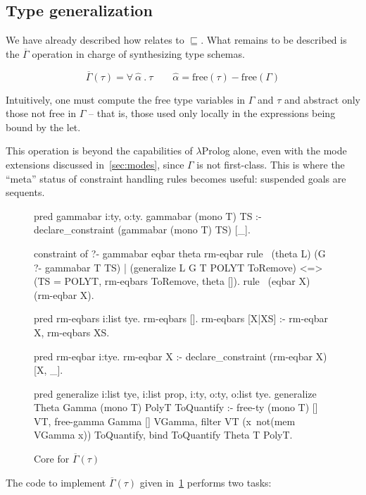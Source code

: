 \documentclass{these-ISSS}
\newenvironment{elpicode}
  {\VerbatimEnvironment\begin{elpibox}\begin{xelpicode}}{\end{xelpicode}
\end{elpibox}}
\begin{document}
\subsection{Type generalization}

We have already described how  relates to $\sqsubseteq$.
What remains to be described is the $\overline{\Gamma}$ operation
in charge of synthesizing type schemas.

$$
\overline{\Gamma}(\tau) = \forall\ \hat{\alpha}\ .\ \tau \quad\quad \hat{\alpha} = \textrm{free}(\tau) - \textrm{free}(\Gamma)
$$

Intuitively, one must compute the free type variables in $\Gamma$ and $\tau$
and abstract only those not free in $\Gamma$ -- that is, those used only locally
in the expressions being bound by the let.

This operation is beyond the capabilities of $\lambda$Prolog alone, even with
the mode extensions discussed in~\cref{sec:modes}, since $\Gamma$ is not
first-class.
This is where the ``meta'' status of constraint handling rules becomes useful:
suspended goals are sequents.

\begin{figure}[h]
\begin{elpicode}
pred gammabar i:ty, o:ty.
gammabar (mono T) TS :- declare_constraint (gammabar (mono T) TS) [_].

constraint of ?- gammabar eqbar theta rm-eqbar {
  rule  \ (theta L)
          (G ?- gammabar T TS)              %
        | (generalize L G T POLYT ToRemove) %
      <=> (TS = POLYT, rm-eqbars ToRemove, theta []). %
  rule \ (eqbar X) (rm-eqbar X).
}

pred rm-eqbars i:list tye.
rm-eqbars [].
rm-eqbars [X|XS] :- rm-eqbar X, rm-eqbars XS.

pred rm-eqbar i:tye.
rm-eqbar X :- declare_constraint (rm-eqbar X) [X, _].

pred generalize i:list tye, i:list prop, i:ty, o:ty, o:list tye.
generalize Theta Gamma (mono T) PolyT ToQuantify :-
  free-ty (mono T) [] VT,
  free-gamma Gamma [] VGamma,
  filter VT (x\ not(mem VGamma x)) ToQuantify,
  bind ToQuantify Theta T PolyT.
\end{elpicode}
\caption{Core for $\overline{\Gamma}(\tau)$\label{fig:gbar}}
\end{figure}

\noindent
The code to implement $\overline{\Gamma}(\tau)$ given in~\cref{fig:gbar}
performs two tasks:
\end{document}
